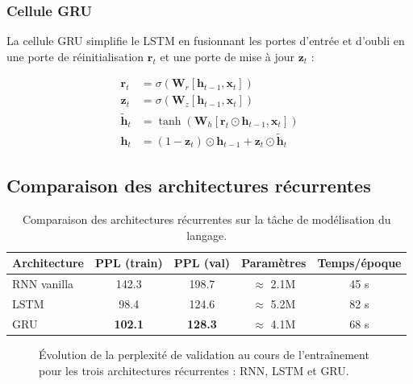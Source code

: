 \documentclass[11pt,a4paper]{article}
\begin{document}
\subsubsection{Cellule GRU}

La cellule GRU \cite{cho2014learning} simplifie le LSTM en fusionnant les portes
d'entrée et d'oubli en une porte de réinitialisation $\mathbf{r}_t$ et une porte
de mise à jour $\mathbf{z}_t$ :

\begin{align}
  \mathbf{r}_t &= \sigma(\mathbf{W}_r [\mathbf{h}_{t-1}, \mathbf{x}_t]) \label{eq:gru_reset} \\
  \mathbf{z}_t &= \sigma(\mathbf{W}_z [\mathbf{h}_{t-1}, \mathbf{x}_t]) \label{eq:gru_update} \\
  \tilde{\mathbf{h}}_t &= \tanh(\mathbf{W}_h [\mathbf{r}_t \odot \mathbf{h}_{t-1}, \mathbf{x}_t]) \label{eq:gru_candidate} \\
  \mathbf{h}_t &= (1 - \mathbf{z}_t) \odot \mathbf{h}_{t-1} + \mathbf{z}_t \odot \tilde{\mathbf{h}}_t \label{eq:gru_hidden}
\end{align}

\subsection{Comparaison des architectures récurrentes}

\begin{table}[H]
  \centering
  \caption{Comparaison des architectures récurrentes sur la tâche de modélisation du langage.}
  \label{tab:rnn_comparison}
  \begin{tabular}{lcccc}
    \toprule
    \textbf{Architecture} & \textbf{PPL (train)} & \textbf{PPL (val)} & \textbf{Paramètres} & \textbf{Temps/époque} \\
    \midrule
    RNN vanilla  & 142.3 & 198.7 & $\approx$ 2.1M & 45 s \\
    LSTM         & 98.4  & 124.6 & $\approx$ 5.2M & 82 s \\
    GRU          & \textbf{102.1} & \textbf{128.3} & $\approx$ 4.1M & 68 s \\
    \bottomrule
  \end{tabular}
\end{table}

\begin{figure}[H]
  \centering
  \caption{Évolution de la perplexité de validation au cours de l'entraînement
           pour les trois architectures récurrentes : RNN, LSTM et GRU.}
  \label{fig:rnn_comparison}
\end{figure}
\end{document}
